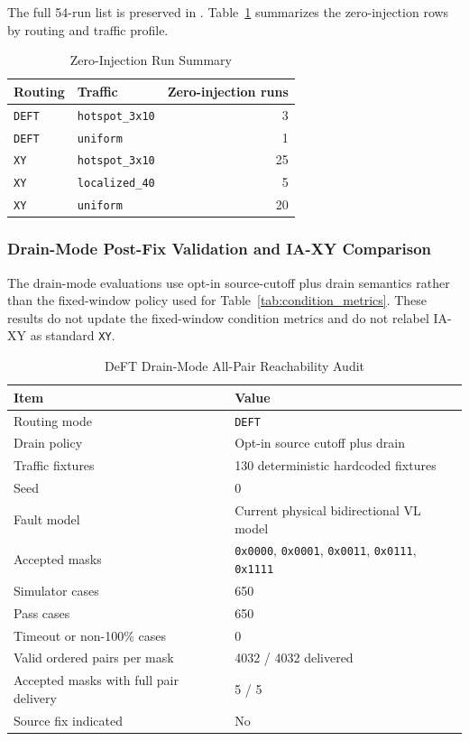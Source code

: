 \documentclass[conference]{IEEEtran}
\begin{document}
The full 54-run list is preserved in . Table~\ref{tab:zero_injection} summarizes the zero-injection rows by routing and traffic profile.

\begin{table}[t]
\centering
\caption{Zero-Injection Run Summary}
\label{tab:zero_injection}
\begin{tabular}{@{}llr@{}}
\toprule
\textbf{Routing} & \textbf{Traffic} & \textbf{Zero-injection runs} \\
\midrule
\texttt{DEFT} & \texttt{hotspot\_3x10} & 3 \\
\texttt{DEFT} & \texttt{uniform} & 1 \\
\texttt{XY} & \texttt{hotspot\_3x10} & 25 \\
\texttt{XY} & \texttt{localized\_40} & 5 \\
\texttt{XY} & \texttt{uniform} & 20 \\
\bottomrule
\end{tabular}
\end{table}

\subsubsection{Drain-Mode Post-Fix Validation and IA-XY Comparison}
\label{sec:drain_mode_results}

The drain-mode evaluations use opt-in source-cutoff plus drain semantics rather than the fixed-window policy used for Table~\ref{tab:condition_metrics}. These results do not update the fixed-window condition metrics and do not relabel IA-XY as standard \texttt{XY}.

\begin{table}[t]
\centering
\caption{DeFT Drain-Mode All-Pair Reachability Audit}
\label{tab:t0060_drain_summary}
\begin{tabularx}{\columnwidth}{@{}lX@{}}
\toprule
\textbf{Item} & \textbf{Value} \\
\midrule
Routing mode & \texttt{DEFT} \\
Drain policy & Opt-in source cutoff plus drain \\
Traffic fixtures & 130 deterministic hardcoded fixtures \\
Seed & 0 \\
Fault model & Current physical bidirectional VL model \\
Accepted masks & \texttt{0x0000}, \texttt{0x0001}, \texttt{0x0011}, \texttt{0x0111}, \texttt{0x1111} \\
Simulator cases & 650 \\
Pass cases & 650 \\
Timeout or non-100\% cases & 0 \\
Valid ordered pairs per mask & 4032 / 4032 delivered \\
Accepted masks with full pair delivery & 5 / 5 \\
Source fix indicated & No \\
\bottomrule
\end{tabularx}
\end{table}
\end{document}
